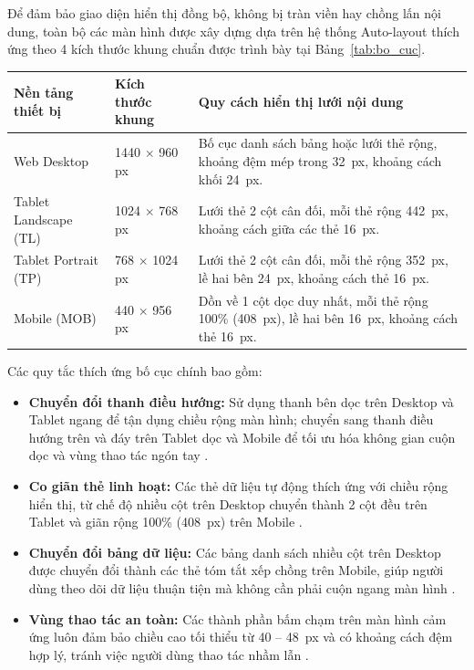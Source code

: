 \documentclass[12pt,a4paper,oneside]{report}
\begin{document}
Để đảm bảo giao diện hiển thị đồng bộ, không bị tràn viền hay chồng lấn nội dung, toàn bộ các màn hình được xây dựng dựa trên hệ thống Auto-layout thích ứng theo 4 kích thước khung chuẩn được trình bày tại Bảng~\ref{tab:bo_cuc}.

\newpage
\begin{center}
\vspace{4pt}
\begin{tabular}{|p{3.3cm}|p{3.2cm}|p{7.5cm}|}
\hline
\textbf{Nền tảng thiết bị} & \textbf{Kích thước khung} & \textbf{Quy cách hiển thị lưới nội dung} \\
\hline
Web Desktop & 1440 $\times$ 960 px & Bố cục danh sách bảng hoặc lưới thẻ rộng, khoảng đệm mép trong 32~px, khoảng cách khối 24~px. \\
\hline
Tablet Landscape (TL) & 1024 $\times$ 768 px & Lưới thẻ 2 cột cân đối, mỗi thẻ rộng 442~px, khoảng cách giữa các thẻ 16~px. \\
\hline
Tablet Portrait (TP) & 768 $\times$ 1024 px & Lưới thẻ 2 cột cân đối, mỗi thẻ rộng 352~px, lề hai bên 24~px, khoảng cách thẻ 16~px. \\
\hline
Mobile (MOB) & 440 $\times$ 956 px & Dồn về 1 cột dọc duy nhất, mỗi thẻ rộng 100\% (408~px), lề hai bên 16~px, khoảng cách thẻ 16~px. \\
\hline
\end{tabular}
\end{center}

Các quy tắc thích ứng bố cục chính bao gồm:
\begin{itemize}
  \item \textbf{Chuyển đổi thanh điều hướng:} Sử dụng thanh bên dọc trên Desktop và Tablet ngang để tận dụng chiều rộng màn hình; chuyển sang thanh điều hướng trên và đáy trên Tablet dọc và Mobile để tối ưu hóa không gian cuộn dọc và vùng thao tác ngón tay \cite{wcag22}.
  \item \textbf{Co giãn thẻ linh hoạt:} Các thẻ dữ liệu tự động thích ứng với chiều rộng hiển thị, từ chế độ nhiều cột trên Desktop chuyển thành 2 cột đều trên Tablet và giãn rộng 100\% (408~px) trên Mobile \cite{wcag22}.
  \item \textbf{Chuyển đổi bảng dữ liệu:} Các bảng danh sách nhiều cột trên Desktop được chuyển đổi thành các thẻ tóm tắt xếp chồng trên Mobile, giúp người dùng theo dõi dữ liệu thuận tiện mà không cần phải cuộn ngang màn hình \cite{wcag22}.
  \item \textbf{Vùng thao tác an toàn:} Các thành phần bấm chạm trên màn hình cảm ứng luôn đảm bảo chiều cao tối thiểu từ 40 -- 48~px và có khoảng cách đệm hợp lý, tránh việc người dùng thao tác nhầm lẫn \cite{wcag22}.
\end{itemize}
\end{document}
